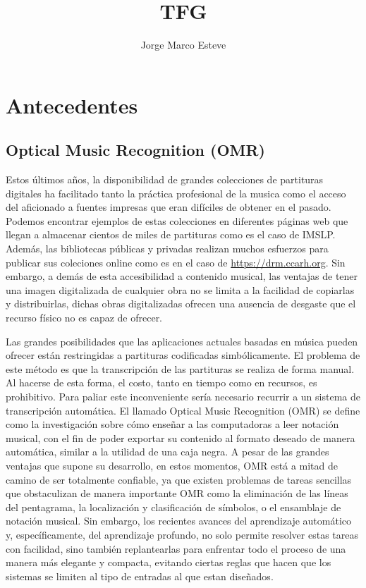 \documentclass{article}
\title{TFG}
\author{Jorge Marco Esteve}
\begin{document}
\maketitle

\section{Antecedentes}
\subsection{Optical Music Recognition (OMR)}

 Estos últimos años, la disponibilidad de grandes colecciones de partituras digitales ha facilitado tanto la práctica
profesional de la musica como el acceso del aficionado a fuentes impresas que eran difíciles de obtener en el pasado.
Podemos encontrar ejemplos de estas colecciones en diferentes páginas web que llegan a almacenar cientos de miles de partituras
como es el caso de IMSLP. Además, las bibliotecas públicas y privadas realizan muchos esfuerzos para publicar sus coleciones
online como es en el caso de \url{https://drm.ccarh.org}. Sin embargo, a demás de esta accesibilidad a contenido musical, las
ventajas de tener una imagen digitalizada de cualquier obra no se limita a la facilidad de copiarlas y distribuirlas, dichas obras 
digitalizadas ofrecen una ausencia de desgaste que el recurso físico no es capaz de ofrecer.

Las grandes posibilidades que las aplicaciones actuales basadas en música pueden ofrecer están restringidas a partituras codificadas
simbólicamente. El problema de este método es que la transcripción de las partituras se realiza de forma manual. Al hacerse de esta
forma, el costo, tanto en tiempo como en recursos, es prohibitivo. Para paliar este inconveniente sería necesario recurrir a un sistema
 de transcripción automática. El llamado Optical Music Recognition (OMR) se define como la investigación sobre cómo enseñar a las
computadoras a leer notación musical, con el fin de poder exportar su contenido al formato deseado de manera automática, similar a la
utilidad de una caja negra. A pesar de las grandes ventajas que supone su desarrollo, en estos momentos, OMR está a mitad de camino de
ser totalmente confiable, ya que existen problemas de tareas sencillas que obstaculizan de manera importante OMR como la eliminación de
las líneas del pentagrama, la localización y clasificación de símbolos, o el ensamblaje de notación musical. Sin embargo, los recientes
avances del aprendizaje automático y, específicamente, del aprendizaje profundo, no solo permite resolver estas tareas con facilidad,
sino también replantearlas para enfrentar todo el proceso de una manera más elegante y compacta, evitando ciertas reglas que hacen que los
sistemas se limiten al tipo de entradas al que estan diseñados.
\end{document}
